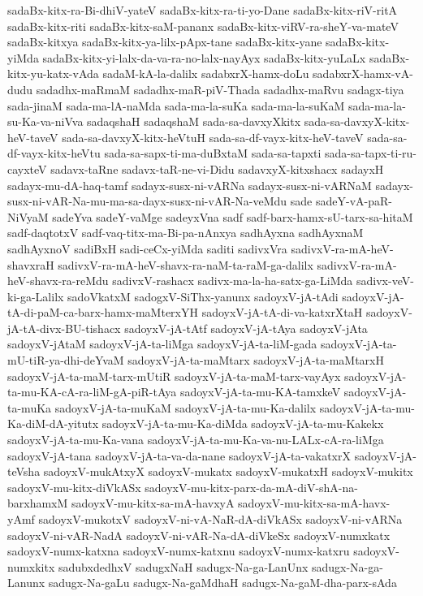 {sadaBx-kitx-ra-Bi-dhiV-yateV
sadaBx-kitx-ra-ti-yo-Dane
sadaBx-kitx-riV-ritA
sadaBx-kitx-riti
sadaBx-kitx-saM-pananx
sadaBx-kitx-viRV-ra-sheY-va-mateV
sadaBx-kitxya
sadaBx-kitx-ya-lilx-pApx-tane
sadaBx-kitx-yane
sadaBx-kitx-yiMda
sadaBx-kitx-yi-lalx-da-va-ra-no-lalx-nayAyx
sadaBx-kitx-yuLaLx
sadaBx-kitx-yu-katx-vAda
sadaM-kA-la-dalilx
sadabxrX-hamx-doLu
sadabxrX-hamx-vA-dudu
sadadhx-maRmaM
sadadhx-maR-piV-Thada
sadadhx-maRvu
sadagx-tiya
sada-jinaM
sada-ma-lA-naMda
sada-ma-la-suKa
sada-ma-la-suKaM
sada-ma-la-su-Ka-va-niVva
sadaqshaH
sadaqshaM
sada-sa-davxyXkitx
sada-sa-davxyX-kitx-heV-taveV
sada-sa-davxyX-kitx-heVtuH
sada-sa-df-vayx-kitx-heV-taveV
sada-sa-df-vayx-kitx-heVtu
sada-sa-sapx-ti-ma-duBxtaM
sada-sa-tapxti
sada-sa-tapx-ti-ru-cayxteV
sadavx-taRne
sadavx-taR-ne-vi-Didu
sadavxyX-kitxshacx
sadayxH
sadayx-mu-dA-haq-tamf
sadayx-susx-ni-vARNa
sadayx-susx-ni-vARNaM
sadayx-susx-ni-vAR-Na-mu-ma-sa-dayx-susx-ni-vAR-Na-veMdu
sade
sadeY-vA-paR-NiVyaM
sadeYva
sadeY-vaMge
sadeyxVna
sadf
sadf-barx-hamx-sU-tarx-sa-hitaM
sadf-daqtotxV
sadf-vaq-titx-ma-Bi-pa-nAnxya
sadhAyxna
sadhAyxnaM
sadhAyxnoV
sadiBxH
sadi-ceCx-yiMda
saditi
sadivxVra
sadivxV-ra-mA-heV-shavxraH
sadivxV-ra-mA-heV-shavx-ra-naM-ta-raM-ga-dalilx
sadivxV-ra-mA-heV-shavx-ra-reMdu
sadivxV-rashacx
sadivx-ma-la-ha-satx-ga-LiMda
sadivx-veV-ki-ga-Lalilx
sadoVkatxM
sadogxV-SiThx-yanunx
sadoyxV-jA-tAdi
sadoyxV-jA-tA-di-paM-ca-barx-hamx-maMterxYH
sadoyxV-jA-tA-di-va-katxrXtaH
sadoyxV-jA-tA-divx-BU-tishacx
sadoyxV-jA-tAtf
sadoyxV-jA-tAya
sadoyxV-jAta
sadoyxV-jAtaM
sadoyxV-jA-ta-liMga
sadoyxV-jA-ta-liM-gada
sadoyxV-jA-ta-mU-tiR-ya-dhi-deYvaM
sadoyxV-jA-ta-maMtarx
sadoyxV-jA-ta-maMtarxH
sadoyxV-jA-ta-maM-tarx-mUtiR
sadoyxV-jA-ta-maM-tarx-vayAyx
sadoyxV-jA-ta-mu-KA-cA-ra-liM-gA-piR-tAya
sadoyxV-jA-ta-mu-KA-tamxkeV
sadoyxV-jA-ta-muKa
sadoyxV-jA-ta-muKaM
sadoyxV-jA-ta-mu-Ka-dalilx
sadoyxV-jA-ta-mu-Ka-diM-dA-yitutx
sadoyxV-jA-ta-mu-Ka-diMda
sadoyxV-jA-ta-mu-Kakekx
sadoyxV-jA-ta-mu-Ka-vana
sadoyxV-jA-ta-mu-Ka-va-nu-LALx-cA-ra-liMga
sadoyxV-jA-tana
sadoyxV-jA-ta-va-da-nane
sadoyxV-jA-ta-vakatxrX
sadoyxV-jA-teVsha
sadoyxV-mukAtxyX
sadoyxV-mukatx
sadoyxV-mukatxH
sadoyxV-mukitx
sadoyxV-mu-kitx-diVkASx
sadoyxV-mu-kitx-parx-da-mA-diV-shA-na-barxhamxM
sadoyxV-mu-kitx-sa-mA-havxyA
sadoyxV-mu-kitx-sa-mA-havx-yAmf
sadoyxV-mukotxV
sadoyxV-ni-vA-NaR-dA-diVkASx
sadoyxV-ni-vARNa
sadoyxV-ni-vAR-NadA
sadoyxV-ni-vAR-Na-dA-diVkeSx
sadoyxV-numxkatx
sadoyxV-numx-katxna
sadoyxV-numx-katxnu
sadoyxV-numx-katxru
sadoyxV-numxkitx
sadubxdedhxV
sadugxNaH
sadugx-Na-ga-LanUnx
sadugx-Na-ga-Lanunx
sadugx-Na-gaLu
sadugx-Na-gaMdhaH
sadugx-Na-gaM-dha-parx-sAda
}
